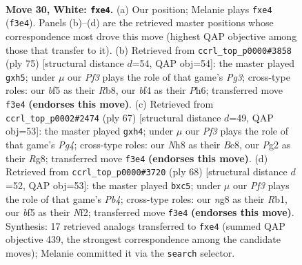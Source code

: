\documentclass[11pt]{article}
\begin{document}
\clearpage

\begin{figure}[p]\centering
\begin{subfigure}{0.46\textwidth}\centering
\resizebox{\linewidth}{!}{%
\newchessgame
\chessboard[
  setfen={r1k3nN/3n4/8/pp3bp1/4pb1p/5P1P/P4KP1/7R w - - 0 30},
  showmover=false,
  pgfstyle=straightmove, color=movearrow, markmove={f3-e4}
]}
\caption{}
\end{subfigure}\hfill
\begin{subfigure}{0.46\textwidth}\centering
\resizebox{\linewidth}{!}{%
\newchessgame
\chessboard[
  setfen={1r3k2/5p2/1P4pp/p2p3P/2nB4/2P2P2/6P1/R6K b - - 0 38},
  showmover=false,
  pgfstyle=straightmove, color=movearrow, markmove={g6-h5}
]}
\caption{}
\end{subfigure}
\\[4pt]
\begin{subfigure}{0.46\textwidth}\centering
\resizebox{\linewidth}{!}{%
\newchessgame
\chessboard[
  setfen={2b3r1/8/1p3k2/p4ppp/P6P/3B2P1/1PP5/4K2R b - - 1 34},
  showmover=false,
  pgfstyle=straightmove, color=movearrow, markmove={g5-h4}
]}
\caption{}
\end{subfigure}\hfill
\begin{subfigure}{0.46\textwidth}\centering
\resizebox{\linewidth}{!}{%
\newchessgame
\chessboard[
  setfen={r1b5/p3k3/n5p1/1ppPp3/1P2P3/4N1Pp/3K1N1P/1R6 w - - 0 35},
  showmover=false,
  pgfstyle=straightmove, color=movearrow, markmove={b4-c5}
]}
\caption{}
\end{subfigure}
\caption{\textbf{Move 30, White: \texttt{fxe4}.} (a) Our position; Melanie plays \texttt{fxe4} (\texttt{f3e4}). Panels (b)--(d) are the retrieved master positions whose correspondence most drove this move (highest QAP objective among those that transfer to it). (b) Retrieved from \texttt{ccrl\_top\_p0000\#3858} (ply 75) [structural distance $d$=54, QAP obj=54]: the master played \texttt{gxh5}; under $\mu$ our \emph{Pf3} plays the role of that game's \emph{Pg3}; cross-type roles: our \emph{b}f5 as their \emph{R}b8, our \emph{b}f4 as their \emph{P}h6; transferred move \texttt{f3e4} \textbf{(endorses this move)}. (c) Retrieved from \texttt{ccrl\_top\_p0002\#2474} (ply 67) [structural distance $d$=49, QAP obj=53]: the master played \texttt{gxh4}; under $\mu$ our \emph{Pf3} plays the role of that game's \emph{Pg4}; cross-type roles: our \emph{N}h8 as their \emph{B}c8, our \emph{P}g2 as their \emph{R}g8; transferred move \texttt{f3e4} \textbf{(endorses this move)}. (d) Retrieved from \texttt{ccrl\_top\_p0000\#3720} (ply 68) [structural distance $d$=52, QAP obj=53]: the master played \texttt{bxc5}; under $\mu$ our \emph{Pf3} plays the role of that game's \emph{Pb4}; cross-type roles: our \emph{n}g8 as their \emph{R}b1, our \emph{b}f5 as their \emph{N}f2; transferred move \texttt{f3e4} \textbf{(endorses this move)}. Synthesis: 17 retrieved analogs transferred to \texttt{fxe4} (summed QAP objective 439, the strongest correspondence among the candidate moves); Melanie committed it via the \texttt{search} selector.}
\label{fig:thought-m58}
\end{figure}
\end{document}
